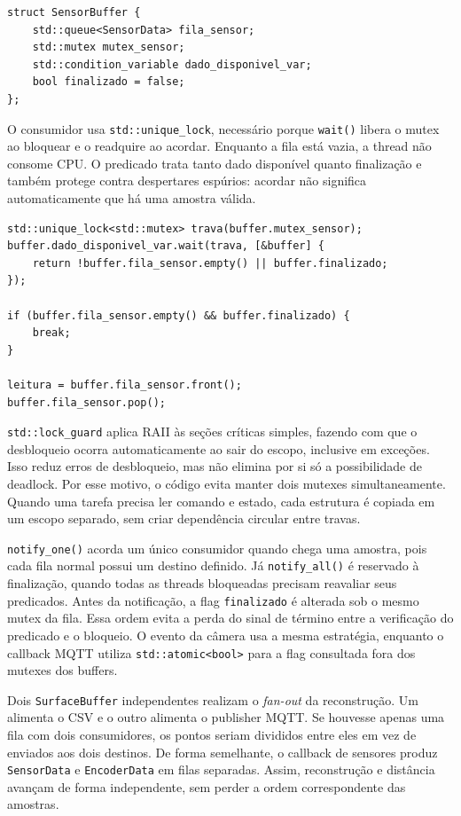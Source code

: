 \documentclass[12pt,a4paper]{article}
\begin{document}
\begin{lstlisting}[style=cppstyle,caption={Estrutura de fila sincronizada.}]
struct SensorBuffer {
    std::queue<SensorData> fila_sensor;
    std::mutex mutex_sensor;
    std::condition_variable dado_disponivel_var;
    bool finalizado = false;
};
\end{lstlisting}

O consumidor usa \texttt{std::unique\_lock}, necessário porque \texttt{wait()} libera o mutex ao bloquear e o readquire ao acordar. Enquanto a fila está vazia, a thread não consome CPU. O predicado trata tanto dado disponível quanto finalização e também protege contra despertares espúrios: acordar não significa automaticamente que há uma amostra válida.

\begin{lstlisting}[style=cppstyle,caption={Espera bloqueante sem polling.}]
std::unique_lock<std::mutex> trava(buffer.mutex_sensor);
buffer.dado_disponivel_var.wait(trava, [&buffer] {
    return !buffer.fila_sensor.empty() || buffer.finalizado;
});

if (buffer.fila_sensor.empty() && buffer.finalizado) {
    break;
}

leitura = buffer.fila_sensor.front();
buffer.fila_sensor.pop();
\end{lstlisting}

\texttt{std::lock\_guard} aplica RAII às seções críticas simples, fazendo com que o desbloqueio ocorra automaticamente ao sair do escopo, inclusive em exceções. Isso reduz erros de desbloqueio, mas não elimina por si só a possibilidade de deadlock. Por esse motivo, o código evita manter dois mutexes simultaneamente. Quando uma tarefa precisa ler comando e estado, cada estrutura é copiada em um escopo separado, sem criar dependência circular entre travas.

\texttt{notify\_one()} acorda um único consumidor quando chega uma amostra, pois cada fila normal possui um destino definido. Já \texttt{notify\_all()} é reservado à finalização, quando todas as threads bloqueadas precisam reavaliar seus predicados. Antes da notificação, a flag \texttt{finalizado} é alterada sob o mesmo mutex da fila. Essa ordem evita a perda do sinal de término entre a verificação do predicado e o bloqueio. O evento da câmera usa a mesma estratégia, enquanto o callback MQTT utiliza \texttt{std::atomic<bool>} para a flag consultada fora dos mutexes dos buffers.

Dois \texttt{SurfaceBuffer} independentes realizam o \textit{fan-out} da reconstrução. Um alimenta o CSV e o outro alimenta o publisher MQTT. Se houvesse apenas uma fila com dois consumidores, os pontos seriam divididos entre eles em vez de enviados aos dois destinos. De forma semelhante, o callback de sensores produz \texttt{SensorData} e \texttt{EncoderData} em filas separadas. Assim, reconstrução e distância avançam de forma independente, sem perder a ordem correspondente das amostras.
\end{document}
